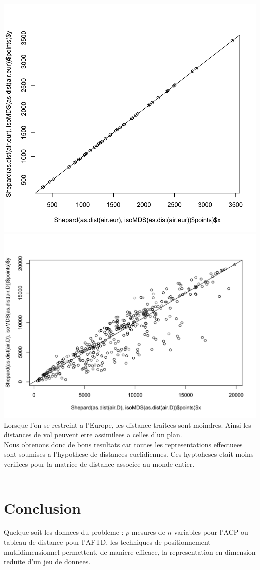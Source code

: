 \documentclass[a4paper,11pt]{article}
\begin{document}
\hspace{-2.3cm} 
\includegraphics[width=.6\textwidth]{Exo3/shep-eur.pdf}
\includegraphics[width=.6\textwidth]{Exo3/shep-monde.pdf}\\

\noindent Lorsque l'on se restreint a l'Europe, les distance traitees sont moindres. Ainsi les distances de vol peuvent etre assimilees a celles d'un plan. \\
Nous obtenons donc de bons resultats car toutes les representations effectuees sont soumises a l'hypothese de distances euclidiennes. Ces hyptoheses  etait moins verifiees pour la matrice de distance associee au monde entier.\\
\\

\section{Conclusion}
\noindent Quelque soit les donnees du probleme : $p$ mesures de $n$ variables pour l'ACP ou tableau de distance pour l'AFTD, les techniques de positionnement mutlidimensionnel permettent, de maniere efficace, la representation en dimension reduite d'un jeu de donnees.\\
\end{document}
